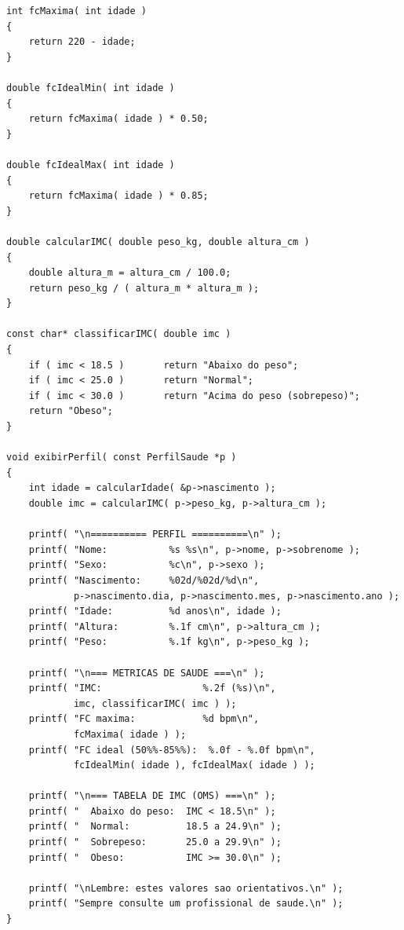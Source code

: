 \documentclass[12pt,a4paper]{article}
\begin{document}
\begin{respostabox}
\begin{lstlisting}
int fcMaxima( int idade )
{
    return 220 - idade;
}

double fcIdealMin( int idade )
{
    return fcMaxima( idade ) * 0.50;
}

double fcIdealMax( int idade )
{
    return fcMaxima( idade ) * 0.85;
}

double calcularIMC( double peso_kg, double altura_cm )
{
    double altura_m = altura_cm / 100.0;
    return peso_kg / ( altura_m * altura_m );
}

const char* classificarIMC( double imc )
{
    if ( imc < 18.5 )       return "Abaixo do peso";
    if ( imc < 25.0 )       return "Normal";
    if ( imc < 30.0 )       return "Acima do peso (sobrepeso)";
    return "Obeso";
}

void exibirPerfil( const PerfilSaude *p )
{
    int idade = calcularIdade( &p->nascimento );
    double imc = calcularIMC( p->peso_kg, p->altura_cm );

    printf( "\n========== PERFIL ==========\n" );
    printf( "Nome:           %s %s\n", p->nome, p->sobrenome );
    printf( "Sexo:           %c\n", p->sexo );
    printf( "Nascimento:     %02d/%02d/%d\n",
            p->nascimento.dia, p->nascimento.mes, p->nascimento.ano );
    printf( "Idade:          %d anos\n", idade );
    printf( "Altura:         %.1f cm\n", p->altura_cm );
    printf( "Peso:           %.1f kg\n", p->peso_kg );

    printf( "\n=== METRICAS DE SAUDE ===\n" );
    printf( "IMC:                  %.2f (%s)\n",
            imc, classificarIMC( imc ) );
    printf( "FC maxima:            %d bpm\n",
            fcMaxima( idade ) );
    printf( "FC ideal (50%%-85%%):  %.0f - %.0f bpm\n",
            fcIdealMin( idade ), fcIdealMax( idade ) );

    printf( "\n=== TABELA DE IMC (OMS) ===\n" );
    printf( "  Abaixo do peso:  IMC < 18.5\n" );
    printf( "  Normal:          18.5 a 24.9\n" );
    printf( "  Sobrepeso:       25.0 a 29.9\n" );
    printf( "  Obeso:           IMC >= 30.0\n" );

    printf( "\nLembre: estes valores sao orientativos.\n" );
    printf( "Sempre consulte um profissional de saude.\n" );
}
\end{lstlisting}


\end{respostabox}
\end{document}
